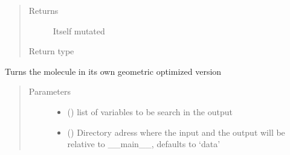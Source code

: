 \documentclass[letterpaper,10pt,english]{sphinxmanual}
\begin{document}
\begin{fulllineitems}
\begin{fulllineitems}
\begin{quote}
\begin{description}
\item[{Returns}] \leavevmode
\sphinxAtStartPar
Itself mutated

\item[{Return type}] \leavevmode
\sphinxAtStartPar
{\hyperref[\detokenize{MolOpt.molecular:MolOpt.molecular.molecular.Molecule}]{}}

\end{description}\end{quote}

\end{fulllineitems}


\begin{fulllineitems}
\label{\detokenize{MolOpt.molecular:MolOpt.molecular.molecular.Molecule.optg}}
\sphinxAtStartPar
Turns the molecule in its own geometric optimized version
\begin{quote}\begin{description}
\item[{Parameters}] \leavevmode\begin{itemize}
\item {} 
\sphinxAtStartPar
{} (\sphinxstyleliteralemphasis{\sphinxupquote{{[}}}\sphinxstyleliteralemphasis{\sphinxupquote{{]}}}) \textendash{} list of variables to be search in the output

\item {} 
\sphinxAtStartPar
{} (\sphinxstyleliteralemphasis{\sphinxupquote{, }}) \textendash{} Directory adress where the input and the output will be relative to \_\_main\_\_, defaults to 
‘data’


\end{itemize}
\end{description}
\end{quote}
\end{fulllineitems}
\end{fulllineitems}
\end{document}
